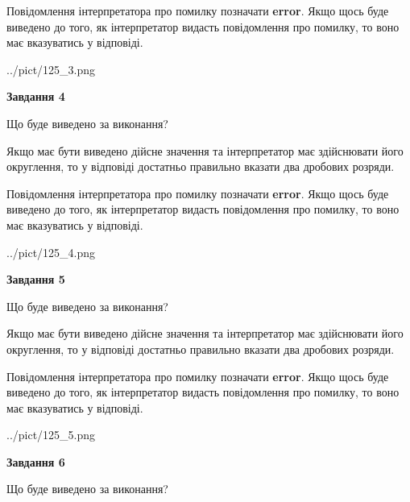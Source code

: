 \documentclass[12pt, ukrainian]{article}
\begin{document}
{\begin {Large}
Повідомлення інтерпретатора про помилку позначати \textbf{error}.
Якщо щось буде виведено до того, як інтерпретатор видасть повідомлення про помилку, 
то воно має вказуватись у відповіді. \par

\begin{center}
	{../pict/125_3.png}
\end{center}
\newpage

{\begin {center}\textbf{Завдання 4}\end {center}}\par
Що буде виведено за виконання? \par

Якщо має бути виведено дійсне значення та інтерпретатор має здійснювати його округлення, 
то у відповіді достатньо правильно вказати два дробових розряди.

Повідомлення інтерпретатора про помилку позначати \textbf{error}.
Якщо щось буде виведено до того, як інтерпретатор видасть повідомлення про помилку, 
то воно має вказуватись у відповіді. \par

\begin{center}
	{../pict/125_4.png}
\end{center}
\newpage

{\begin {center}\textbf{Завдання 5}\end {center}}\par
Що буде виведено за виконання? \par

Якщо має бути виведено дійсне значення та інтерпретатор має здійснювати його округлення, 
то у відповіді достатньо правильно вказати два дробових розряди.

Повідомлення інтерпретатора про помилку позначати \textbf{error}.
Якщо щось буде виведено до того, як інтерпретатор видасть повідомлення про помилку, 
то воно має вказуватись у відповіді. \par

\begin{center}
	{../pict/125_5.png}
\end{center}
\newpage

{\begin {center}\textbf{Завдання 6}\end {center}}\par
Що буде виведено за виконання? \par


\end{Large}}
\end{document}
